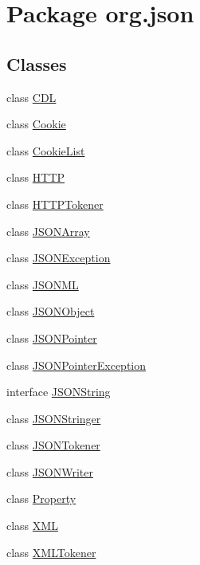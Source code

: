 \hypertarget{namespaceorg_1_1json}{\section{Package org.\-json}
\label{namespaceorg_1_1json}
}
\subsection*{Classes}
\begin{DoxyCompactItemize}
\item 
class \hyperlink{classorg_1_1json_1_1CDL}{C\-D\-L}
\item 
class \hyperlink{classorg_1_1json_1_1Cookie}{Cookie}
\item 
class \hyperlink{classorg_1_1json_1_1CookieList}{Cookie\-List}
\item 
class \hyperlink{classorg_1_1json_1_1HTTP}{H\-T\-T\-P}
\item 
class \hyperlink{classorg_1_1json_1_1HTTPTokener}{H\-T\-T\-P\-Tokener}
\item 
class \hyperlink{classorg_1_1json_1_1JSONArray}{J\-S\-O\-N\-Array}
\item 
class \hyperlink{classorg_1_1json_1_1JSONException}{J\-S\-O\-N\-Exception}
\item 
class \hyperlink{classorg_1_1json_1_1JSONML}{J\-S\-O\-N\-M\-L}
\item 
class \hyperlink{classorg_1_1json_1_1JSONObject}{J\-S\-O\-N\-Object}
\item 
class \hyperlink{classorg_1_1json_1_1JSONPointer}{J\-S\-O\-N\-Pointer}
\item 
class \hyperlink{classorg_1_1json_1_1JSONPointerException}{J\-S\-O\-N\-Pointer\-Exception}
\item 
interface \hyperlink{interfaceorg_1_1json_1_1JSONString}{J\-S\-O\-N\-String}
\item 
class \hyperlink{classorg_1_1json_1_1JSONStringer}{J\-S\-O\-N\-Stringer}
\item 
class \hyperlink{classorg_1_1json_1_1JSONTokener}{J\-S\-O\-N\-Tokener}
\item 
class \hyperlink{classorg_1_1json_1_1JSONWriter}{J\-S\-O\-N\-Writer}
\item 
class \hyperlink{classorg_1_1json_1_1Property}{Property}
\item 
class \hyperlink{classorg_1_1json_1_1XML}{X\-M\-L}
\item 
class \hyperlink{classorg_1_1json_1_1XMLTokener}{X\-M\-L\-Tokener}
\end{DoxyCompactItemize}
